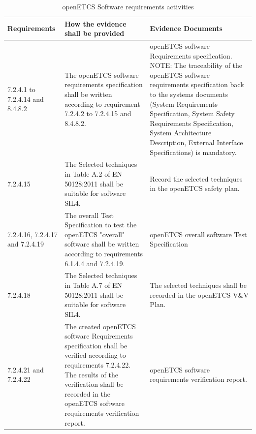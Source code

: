 \documentclass{template/openetcs_report}
\begin{document}
{\footnotesize\sffamily\centering
\begin{longtable}{|p{2cm}|p{9cm}|p{3cm}|}
\caption{openETCS Software requirements activities}\\
\hline
\bfseries Requirements & \bfseries How the evidence shall be provided & \bfseries Evidence Documents\\
\hline
\hline
\endhead
\hline
\endfoot

7.2.4.1 to 7.2.4.14 and 8.4.8.2 & The openETCS software requirements specification shall be written according to requirement 7.2.4.2 to 7.2.4.15 and 8.4.8.2.& openETCS software Requirements specification.
\linebreak
\linebreak
NOTE: \linebreak
The traceability of the openETCS software requirements specification back to the systems documents (System Requirements Specification, System Safety Requirements Specification, System Architecture Description, External Interface Specifications) is mandatory.\\
\hline
7.2.4.15 & The Selected techniques in Table A.2 of EN 50128:2011 shall be suitable for software SIL4.
& Record the selected techniques in the openETCS safety plan.\\ 
\hline
7.2.4.16, 7.2.4.17 and 7.2.4.19 & The overall Test Specification to test the openETCS "overall" software shall be written according to requirements 6.1.4.4 and 7.2.4.19. & openETCS overall software Test Specification\\ 
\hline
7.2.4.18 & The Selected techniques in Table A.7 of EN 50128:2011 shall be suitable for software SIL4. & The selected techniques shall be recorded in the openETCS V\&V Plan.\\ 
\hline
7.2.4.21 and 7.2.4.22 & The created openETCS software Requirements specification shall be verified according to requirements 7.2.4.22. 
The results of the verification shall be recorded in the openETCS software requirements verification report.
& openETCS software requirements verification report.\\ 
\hline
\end{longtable}}
\end{document}
